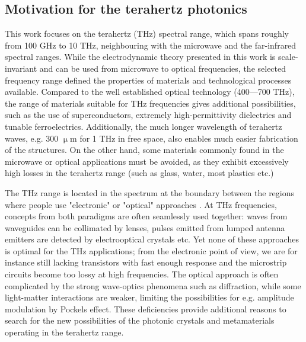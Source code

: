 \subsection{Motivation for the terahertz photonics}
This work focuses on the terahertz (THz) spectral range, which spans roughly from 100 GHz to 10 THz, neighbouring with the microwave and the far-infrared spectral ranges. While the electrodynamic theory presented in this work is scale-invariant and can be used from microwave to optical frequencies, the selected frequency range defined the properties of materials and technological processes available. Compared to the well established optical technology (400---700 THz), the range of materials suitable for THz frequencies gives additional possibilities, such as the use of superconductors, extremely high-permittivity dielectrics and tunable ferroelectrics. Additionally, the much longer wavelength of terahertz waves, e.g. 300 $\upmu$m for 1 THz in free space, also enables much easier fabrication of the structures. On the other hand, some materials commonly found in the microwave or optical applications must be avoided, as they exhibit excessively high losses in the terahertz range (such as glass, water, most plastics etc.)

The THz range is located in the spectrum at the boundary between the regions where people use "electronic" or "optical" approaches \cite{ozyuzer2007emission}. At THz frequencies, concepts from both paradigms are often seamlessly used together: waves from waveguides can be collimated by lenses, pulses emitted from lumped antenna emitters are detected by electrooptical crystals etc. 
Yet none of these approaches is optimal for the THz applications; from the electronic point of view, we are for instance still lacking transistors with fast enough response and the microstrip circuits become too lossy at high frequencies. The optical approach is often complicated by the strong wave-optics phenomena such as diffraction, while some light-matter interactions are weaker, limiting the possibilities for e.g. amplitude modulation by Pockels effect. These deficiencies provide additional reasons to search for the new possibilities of the photonic crystals and metamaterials operating in the terahertz range.


